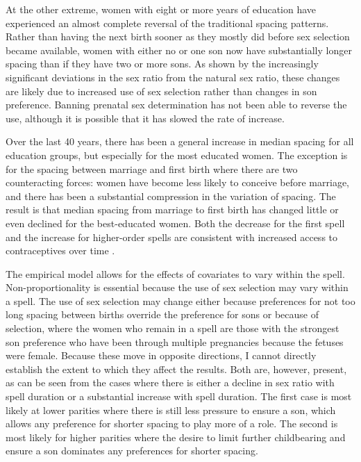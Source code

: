 \documentclass[12pt,letterpaper]{article}
\begin{document}
At the other extreme, women with eight or more years of education have
experienced an almost complete reversal of the traditional spacing patterns.
Rather than having the next birth sooner as they mostly did before 
sex selection became available, women with either no or one son now 
have substantially longer spacing than if they have two or more sons.
As shown by the increasingly significant deviations in the sex ratio
from the natural sex ratio, these changes are likely due to increased
use of sex selection rather than changes in son preference. 
Banning prenatal sex determination has not been able to
reverse the use, although it is possible that it has slowed the rate 
of increase.

Over the last 40 years, there has been a general increase in median
spacing for all education groups, but especially for the most 
educated women.
The exception is for the spacing between marriage and first birth
where there are two counteracting forces: women have become less likely 
to conceive before marriage, and there has been a substantial compression 
in the variation of spacing.
The result is that median spacing from marriage to first birth
has changed little or even declined for the best-educated women.
Both the decrease for the first spell and the increase for higher-order
spells are consistent with increased access to contraceptives over
time \citep{Yeakey2009}.

The empirical model allows for the effects of covariates
to vary within the spell. 
Non-proportionality is essential because the use of sex selection may 
vary within a spell. 
The use of sex selection may change either because preferences for not 
too long spacing between births override the preference for sons or 
because of selection, where
the women who remain in a spell are those with the strongest son
preference who have been through multiple pregnancies because the
fetuses were female. 
Because these move in opposite directions, I cannot
directly establish the extent to which they affect the results. 
Both are, however, present, as can be seen from the cases where there is
either a decline in sex ratio with spell duration or a substantial
increase with spell duration. 
The first case is most likely at lower
parities where there is still less pressure to ensure a son, which
allows any preference for shorter spacing to play more of a role. 
The second is most likely for higher
parities where the desire to limit further childbearing and ensure a son
dominates any preferences for shorter spacing.
\end{document}
